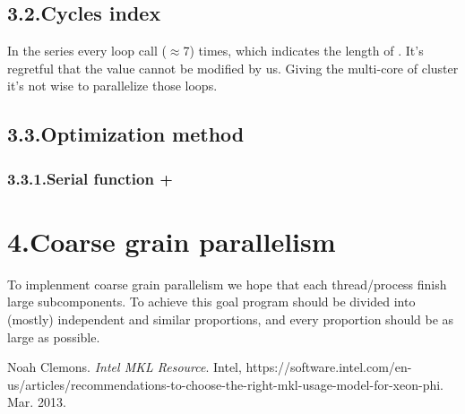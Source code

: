 \documentclass{article}
\begin{document}
\subsection{3.2.\hspace*{0.5em}Cycles index}\label{sec-cycles-index}%

\noindent{}In the  series every loop call  (\ensuremath{\approx}7) times, which indicates the length of . It's regretful that the value cannot be modified by us. Giving the multi-core of cluster it's not wise to parallelize those loops.%

\subsection{3.3.\hspace*{0.5em}Optimization method}\label{sec-optimization-method}%

\subsubsection{3.3.1.\hspace*{0.5em}Serial  function +}\label{sec-serial-mkl-function-}%

\section{4.\hspace*{0.5em}Coarse grain parallelism}\label{sec-coarse-grain-parallelism}%

\noindent{}To implenment coarse grain parallelism we hope that each thread/process finish large subcomponents. To achieve this goal  program should be divided into (mostly) independent and similar proportions, and every proportion should be as large as possible.%

{%
\begin{thebibliography}{1}%
\label{sec-bibliography}%

Noah Clemons. \emph{Intel MKL Resource}. Intel, https://software.intel.com/en-us/articles/recommendations-to-choose-the-right-mkl-usage-model-for-xeon-phi. Mar. 2013.\label{mkl-mic}%
\par%
\end{thebibliography}}%
\end{document}
